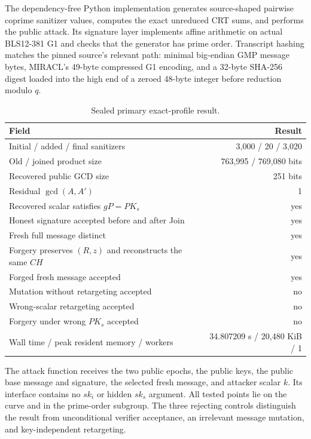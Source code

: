 \documentclass[10pt,a4paper]{article}
\begin{document}
The dependency-free Python implementation generates source-shaped pairwise
coprime sanitizer values, computes the exact unreduced CRT sums, and performs
the public attack. Its signature layer implements affine arithmetic on actual
BLS12-381 G1 and checks that the generator has prime order. Transcript hashing
matches the pinned source's relevant path: minimal big-endian GMP message
bytes, MIRACL's 49-byte compressed G1 encoding, and a 32-byte SHA-256 digest
loaded into the high end of a zeroed 48-byte integer before reduction modulo
\(q\).

\begin{table}[ht]
\centering
\caption{Sealed primary exact-profile result.}
\label{tab:primary}
\begin{tabularx}{\textwidth}{@{}Xr@{}}
\toprule
Field & Result \\
\midrule
Initial / added / final sanitizers & 3,000 / 20 / 3,020 \\
Old / joined product size & 763,995 / 769,080 bits \\
Recovered public GCD size & 251 bits \\
Residual \(\gcd(A,A')\) & 1 \\
Recovered scalar satisfies \(gP=PK_s\) & yes \\
Honest signature accepted before and after Join & yes \\
Fresh full message distinct & yes \\
Forgery preserves \((R,z)\) and reconstructs the same \(CH\) & yes \\
Forged fresh message accepted & yes \\
Mutation without retargeting accepted & no \\
Wrong-scalar retargeting accepted & no \\
Forgery under wrong \(PK_s\) accepted & no \\
Wall time / peak resident memory / workers & 34.807209 s / 20,480 KiB / 1 \\
\bottomrule
\end{tabularx}
\end{table}

The attack function receives the two public epochs, the public keys, the
public base message and signature, the selected fresh message, and attacker
scalar \(k\). Its interface contains no \(sk_i\) or hidden \(sk_s\) argument.
All tested points lie on the curve and in the prime-order subgroup. The three
rejecting controls distinguish the result from unconditional verifier
acceptance, an irrelevant message mutation, and key-independent retargeting.
\end{document}
